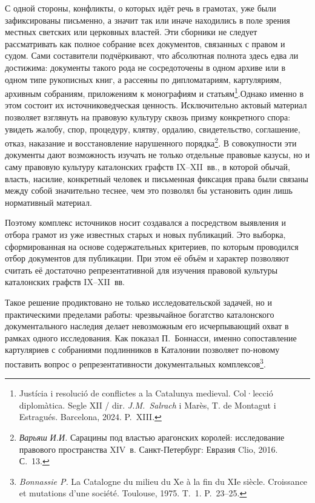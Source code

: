 С одной стороны, конфликты, о которых идёт речь в грамотах, уже были зафиксированы письменно, а значит так или иначе находились в поле зрения местных светских или церковных властей. Эти сборники не следует рассматривать как полное собрание всех документов, связанных с правом и судом. Сами составители подчёркивают, что абсолютная полнота здесь едва ли достижима: документы такого рода не сосредоточены в одном архиве или в одном типе рукописных книг, а рассеяны по дипломатариям, картуляриям, архивным собраниям, приложениям к монографиям и статьям\footnote{Justícia i resolució de conflictes a la Catalunya medieval. Col·lecció diplomàtica. Segle XII / dir. \emph{J.M.~Salrach} i Marès, T. de Montagut i Estragués. Barcelona, 2024. P.~XIII.}.Однако именно в этом состоит их источниковедческая ценность. Исключительно актовый материал позволяет взглянуть на правовую культуру сквозь призму конкретного спора: увидеть жалобу, спор, процедуру, клятву, ордалию, свидетельство, соглашение, отказ, наказание и восстановление нарушенного порядка\footnote{\emph{Варьяш}\emph{ И.И.} Сарацины под властью арагонских королей: исследование правового пространства XIV~в. Санкт-Петербург: Евразия Clio, 2016. С.~13.}. В совокупности эти документы дают возможность изучать не только отдельные правовые казусы, но и саму правовую культуру каталонских графств IX--XII~вв., в которой обычай, власть, насилие, конкретный человек и письменная фиксация права были связаны между собой значительно теснее, чем это позволял бы установить один лишь нормативный материал.

Поэтому комплекс источников носит создавался а посредством выявления и отбора грамот из уже известных старых и новых публикаций. Это выборка, сформированная на основе содержательных критериев, по которым проводился отбор документов для публикации. При этом её объём и характер позволяют считать её достаточно репрезентативной для изучения правовой культуры каталонских графств IX--XII~вв.

Такое решение продиктовано не только исследовательской задачей, но и практическими пределами работы: чрезвычайное богатство каталонского документального наследия делает невозможным его исчерпывающий охват в рамках одного исследования. Как показал П.~Боннасси, именно сопоставление картуляриев с собраниями подлинников в Каталонии позволяет по-новому поставить вопрос о репрезентативности документальных комплексов\footnote{\emph{Bonnassie P. }La Catalogne du milieu du Xe à la fin du XIe siècle. Croissance et mutations d’une société. Toulouse, 1975. T.~1. P.~23--25.}.

